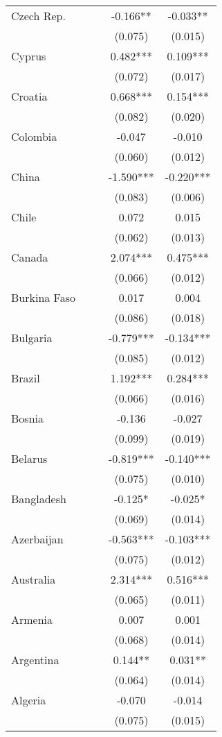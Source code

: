 \documentclass[]{article}
\begin{document}
\begin{tabular}{lcccc}
Czech Rep. &  &  & -0.166** & -0.033** \\
 &  &  & (0.075) & (0.015) \\
Cyprus &  &  & 0.482*** & 0.109*** \\
 &  &  & (0.072) & (0.017) \\
Croatia &  &  & 0.668*** & 0.154*** \\
 &  &  & (0.082) & (0.020) \\
Colombia &  &  & -0.047 & -0.010 \\
 &  &  & (0.060) & (0.012) \\
China &  &  & -1.590*** & -0.220*** \\
 &  &  & (0.083) & (0.006) \\
Chile &  &  & 0.072 & 0.015 \\
 &  &  & (0.062) & (0.013) \\
Canada &  &  & 2.074*** & 0.475*** \\
 &  &  & (0.066) & (0.012) \\
Burkina Faso &  &  & 0.017 & 0.004 \\
 &  &  & (0.086) & (0.018) \\
Bulgaria &  &  & -0.779*** & -0.134*** \\
 &  &  & (0.085) & (0.012) \\
Brazil &  &  & 1.192*** & 0.284*** \\
 &  &  & (0.066) & (0.016) \\
Bosnia &  &  & -0.136 & -0.027 \\
 &  &  & (0.099) & (0.019) \\
Belarus &  &  & -0.819*** & -0.140*** \\
 &  &  & (0.075) & (0.010) \\
Bangladesh &  &  & -0.125* & -0.025* \\
 &  &  & (0.069) & (0.014) \\
Azerbaijan &  &  & -0.563*** & -0.103*** \\
 &  &  & (0.075) & (0.012) \\
Australia &  &  & 2.314*** & 0.516*** \\
 &  &  & (0.065) & (0.011) \\
Armenia &  &  & 0.007 & 0.001 \\
 &  &  & (0.068) & (0.014) \\
Argentina &  &  & 0.144** & 0.031** \\
 &  &  & (0.064) & (0.014) \\
Algeria &  &  & -0.070 & -0.014 \\
 &  &  & (0.075) & (0.015) \\

\end{tabular}
\end{document}
